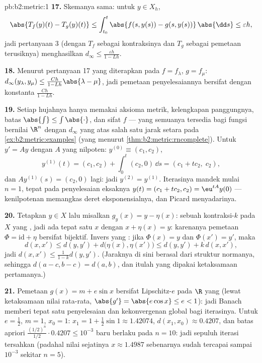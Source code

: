 \begin{solution}{pb:b2:metric:1}
\textbf{17.} Skemanya sama: untuk $y \in X_h$,
\[
\abs{T_f(y)(t) - T_g(y)(t)} \leq \int_{t_0}^t \abs{f(s,y(s)) -
g(s,y(s))}\,\abs{\dd s} \leq \varepsilon h ,
\]
jadi pertanyaan 3 (dengan $T_f$ sebagai kontraksinya dan $T_g$ sebagai
pemetaan terusiknya) menghasilkan $d_\infty \leq \frac{\varepsilon h}{1 - Lh}$.

\textbf{18.} Menurut pertanyaan 17 yang diterapkan pada $f = f_\lambda$,
$g = f_\mu$: $d_\infty(y_\lambda, y_\mu) \leq \frac{Ch}{1 -
Lh}\abs{\lambda - \mu}$, jadi pemetaan penyelesaiannya bersifat 
dengan konstanta $\frac{Ch}{1-Lh}$.

\textbf{19.} Setiap hujahnya hanya memakai aksioma metrik,
kelengkapan panggungnya, batas $\abs{\int} \leq
\int\abs{\cdot}$, dan sifat  $f$ --- yang semuanya
tersedia bagi fungsi bernilai $\R^n$ dengan $d_\infty$ yang  atas
salah satu jarak setara pada \cref{ex:b2:metric:examples}
(yang  menurut \cref{thm:b2:metric:rncomplete}). Untuk $y' = Ay$
dengan $A$ yang nilpoten: $y^{(0)} \equiv (c_1, c_2)$,
\[
y^{(1)}(t) = (c_1, c_2) + \int_0^t (c_2, 0)\,\dd s
= (c_1 + tc_2,\; c_2),
\]
dan $Ay^{(1)}(s) = (c_2, 0)$ lagi: jadi $y^{(2)} = y^{(1)}$.
Iterasinya mandek mulai $n = 1$, tepat pada penyelesaian eksaknya
$y(t) = (c_1 + tc_2, c_2) = \eu^{tA}y(0)$ --- kenilpotenan
memangkas deret eksponensialnya, dan Picard menyadarinya.

\textbf{20.} Tetapkan $y \in X$ lalu misalkan $g_y(x) = y - \eta(x)$:
sebuah kontraksi-$k$ pada $X$ yang , jadi ada tepat satu $x$
dengan $x + \eta(x) = y$: karenanya pemetaan $\Phi = \mathrm{id} + \eta$
bersifat bijektif. Invers yang : jika $\Phi(x) = y$ dan
$\Phi(x') = y'$, maka
\[
d(x, x') \leq d(y, y') + d\bigl(\eta(x), \eta(x')\bigr)
\leq d(y, y') + k\,d(x, x'),
\]
jadi $d(x, x') \leq \frac{1}{1-k}d(y, y')$. (Jaraknya di sini berasal
dari struktur normanya, sehingga $d(a - c, b - c) = d(a, b)$, dan itulah
yang dipakai ketaksamaan pertamanya.)

\textbf{21.} Pemetaan $g(x) = m + e\sin x$ bersifat Lipschitz-$e$ pada
$\R$ yang  (lewat ketaksamaan nilai rata-rata, $\abs{g'} =
\abs{e\cos x} \leq e < 1$): jadi Banach memberi tepat satu penyelesaian
dan kekonvergenan global bagi iterasinya. Untuk $e = \frac12$, $m = 1$,
$x_0 = 1$: $x_1 = 1 + \frac12\sin 1 \approx 1.42074$, $d(x_1, x_0)
\approx 0.4207$, dan batas apriori
$\frac{(1/2)^n}{1/2}\cdot 0.4207 \leq 10^{-3}$ baru berlaku pada
$n = 10$: jadi sepuluh iterasi tersahkan (padahal nilai sejatinya $x
\approx 1.4987$ sebenarnya sudah tercapai sampai $10^{-3}$ sekitar $n =
5$).


\end{solution}

